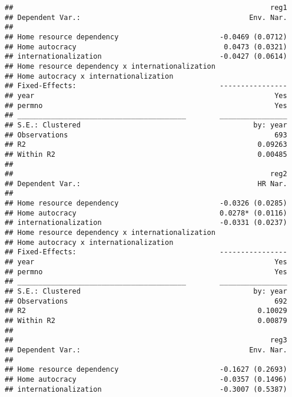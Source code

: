 \documentclass[
]{article}
\begin{document}
\begin{verbatim}
##                                                             reg1
## Dependent Var.:                                        Env. Nar.
##                                                                 
## Home resource dependency                        -0.0469 (0.0712)
## Home autocracy                                   0.0473 (0.0321)
## internationalization                            -0.0427 (0.0614)
## Home resource dependency x internationalization                 
## Home autocracy x internationalization                           
## Fixed-Effects:                                  ----------------
## year                                                         Yes
## permno                                                       Yes
## ________________________________________        ________________
## S.E.: Clustered                                         by: year
## Observations                                                 693
## R2                                                       0.09263
## Within R2                                                0.00485
## 
##                                                             reg2
## Dependent Var.:                                          HR Nar.
##                                                                 
## Home resource dependency                        -0.0326 (0.0285)
## Home autocracy                                  0.0278* (0.0116)
## internationalization                            -0.0331 (0.0237)
## Home resource dependency x internationalization                 
## Home autocracy x internationalization                           
## Fixed-Effects:                                  ----------------
## year                                                         Yes
## permno                                                       Yes
## ________________________________________        ________________
## S.E.: Clustered                                         by: year
## Observations                                                 692
## R2                                                       0.10029
## Within R2                                                0.00879
## 
##                                                             reg3
## Dependent Var.:                                        Env. Nar.
##                                                                 
## Home resource dependency                        -0.1627 (0.2693)
## Home autocracy                                  -0.0357 (0.1496)
## internationalization                            -0.3007 (0.5387)

\end{verbatim}
\end{document}
